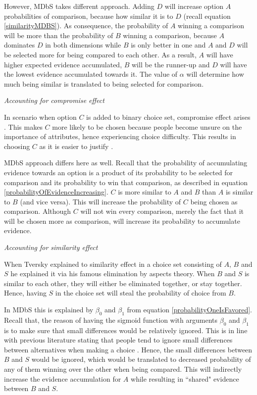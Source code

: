 \documentclass[a4paper,12pt]{article}
\newcommand{\citeyearonly}[1]{\citeyearpar{#1}}
\begin{document}
However, MDbS takes different approach. Adding $D$ will increase option $A$ probabilities of comparison, because how similar it is to $D$ (recall equation \ref{similarityMDBS}). As consequence, the probability of $A$ winning a comparison will be more than the probability of $B$ winning a comparison, because $A$ dominates $D$ in both dimensions while $B$ is only better in one and $A$ and $D$ will be selected more for being  compared to each other. As a result, $A$ will have higher expected evidence accumulated, $B$ will be the runner-up and $D$ will have the lowest evidence accumulated towards it. The value of $\alpha$ will determine how much being similar is translated to being selected for comparison.

\textit{Accounting for compromise effect}

In scenario when option $C$ is added to binary choice set, compromise effect arises \citep{simonson89}. This makes $C$ more likely to be chosen because people become unsure on the importance of attributes, hence experiencing choice difficulty. This results in choosing $C$ as it is easier to justify \citep{simonson89}. 

MDbS approach differs here as well. Recall that the probability of accumulating evidence towards an option is a product of its probability to be selected for comparison and its probability to win that comparison, as described in equation \ref{probabilityOfEvidenceIncreasing}. $C$ is more similar to $A$ and $B$ than $A$ is similar to $B$ (and vice versa). This will increase the probability of $C$ being chosen as comparison. Although $C$ will not win every comparison, merely the fact that it will be chosen more as comparison, will increase its probability to accumulate evidence.

\textit{Accounting for similarity effect}

When Tversky \citeyearonly{tversky1972elimination} explained to similarity effect in a choice set consisting of $A$, $B$ and $S$ he explained it via his famous elimination by aspects theory. When $B$ and $S$ is similar to each other, they will either be eliminated together, or stay together. Hence, having $S$ in the choice set will steal the probability of choice from $B$.

In MDbS this is explained by $\beta_0$ and $\beta_1$ from equation \ref{probabilityOneIsFavored}. Recall that, the reason of having the sigmoid function with arguments $\beta_0$ and $\beta_1$ is to make sure that small differences would be relatively ignored. This is in line with previous literature stating that people tend to ignore small differences between alternatives when making a choice \citep{kalwani1992consumer}. Hence, the small differences between $B$ and $S$ would be ignored, which would be translated to decreased probability of any of them winning over the other when being compared. This will indirectly increase the evidence accumulation for $A$ while resulting in ``shared" evidence between $B$ and $S$.
\end{document}
